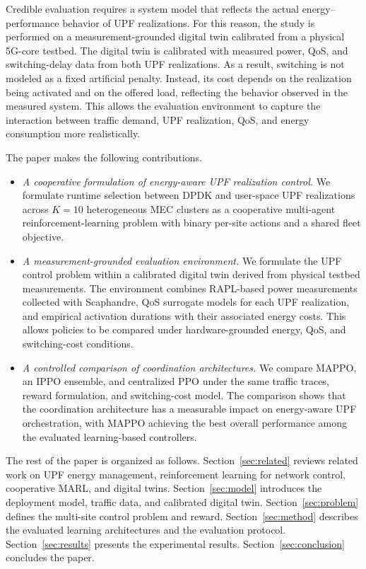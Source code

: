 \documentclass[10pt,conference,letterpaper]{IEEEtran}
\begin{document}
Credible evaluation requires a system model that reflects the actual
energy--performance behavior of UPF realizations. For this reason, the study is
performed on a measurement-grounded digital twin calibrated from a physical
5G-core testbed. The digital twin is calibrated with measured power, QoS, and switching-delay data from both UPF realizations. As a result, switching is not modeled as a fixed artificial penalty. Instead, its cost depends on the realization being activated and on the offered load, reflecting the behavior observed in the measured system. This allows the evaluation environment to capture the interaction between traffic demand, UPF realization, QoS, and energy consumption more realistically.

The paper makes the following contributions.
\begin{itemize}
\item \emph{A cooperative formulation of energy-aware UPF realization control.}
We formulate runtime selection between DPDK and user-space UPF realizations
across $K=10$ heterogeneous MEC clusters as a cooperative multi-agent
reinforcement-learning problem with binary per-site actions and a shared fleet
objective.

\item \emph{A measurement-grounded evaluation environment.}
We formulate the UPF control problem within a calibrated digital twin derived from physical testbed measurements. The environment combines RAPL-based power measurements collected with Scaphandre, QoS surrogate models for each UPF realization, and empirical activation durations with their associated energy costs. This allows policies to be compared under hardware-grounded energy, QoS, and switching-cost conditions.

\item \emph{A controlled comparison of coordination architectures.}
We compare MAPPO, an IPPO ensemble, and centralized PPO under the same traffic traces, reward formulation, and switching-cost model. The comparison shows that the coordination architecture has a measurable impact on energy-aware UPF orchestration, with MAPPO achieving the best overall performance among the evaluated learning-based controllers.
\end{itemize}

The rest of the paper is organized as follows. Section~\ref{sec:related}
reviews related work on UPF energy management, reinforcement learning for
network control, cooperative MARL, and digital twins. Section~\ref{sec:model}
introduces the deployment model, traffic data, and calibrated digital twin.
Section~\ref{sec:problem} defines the multi-site control problem and reward.
Section~\ref{sec:method} describes the evaluated learning architectures and the
evaluation protocol. Section~\ref{sec:results} presents the experimental
results. Section~\ref{sec:conclusion} concludes the paper.
\end{document}
